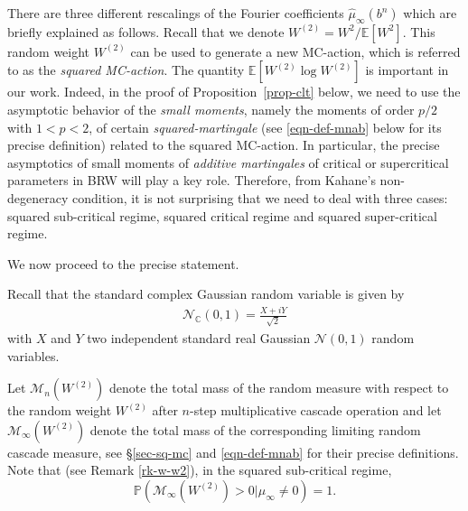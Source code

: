 \documentclass[12pt]{amsart}
\theoremstyle{definition}
\theoremstyle{remark}
\newcommand{\C}{\mathbb{C}}
\newcommand{\E}{\mathbb{E}}
\newcommand{\PP}{\mathbb{P}}
\numberwithin{equation}{section}
\begin{document}
 
 There are three different rescalings of the Fourier coefficients $\widehat{\mu}_\infty(b^n)$ which are briefly explained as follows.  Recall that we denote $W^{(2)}  = W^2/\E[W^2]$.
This random weight  $W^{(2)}$ can be used to   generate a new MC-action, which is referred to as the {\it squared MC-action}. 
The quantity $\E[ W^{(2)} \log W^{(2)}]$ is important in our work. Indeed,  in the proof of Proposition~\ref{prop-clt} below,  we need to use the asymptotic behavior of the {\it small moments}, namely the moments of order $p/2$ with $1<p<2$,  of certain {\it squared-martingale} (see  \eqref{eqn-def-mnab} below for its precise definition)  related to the squared MC-action. In particular,  the precise asymptotics of small moments of {\it  additive martingales} of critical or supercritical parameters in BRW will play a key role. Therefore,    from Kahane's non-degeneracy condition, it is not surprising that we need to deal with three cases:  squared sub-critical regime, squared critical regime and squared super-critical regime. 

\vspace{2mm}

We now proceed to the precise statement. 

Recall that  the standard complex Gaussian random variable is given by 
\begin{align}\label{def-cg}
 \mathcal{N}_{\C}(0,1)  =   \frac{X+iY}{\sqrt{2}} 
\end{align}
with $X$ and $Y$  two independent standard real Gaussian $ \mathcal{N}(0,1)$ random variables. 
 


Let $\mathscr{M}_n(W^{(2)})$ denote the total mass of the random measure  with respect to the random weight $W^{(2)}$  after $n$-step multiplicative cascade operation and let $\mathscr{M}_\infty(W^{(2)})$ denote the total mass of the corresponding limiting random cascade measure, see \S \ref{sec-sq-mc}  and \eqref{eqn-def-mnab} for their precise definitions.   Note that   (see Remark \ref{rk-w-w2}),  in the squared sub-critical regime,
\[
\PP(\mathscr{M}_\infty(W^{(2)}) > 0  | \mu_\infty\ne 0)=1.
\] 
\end{document}
